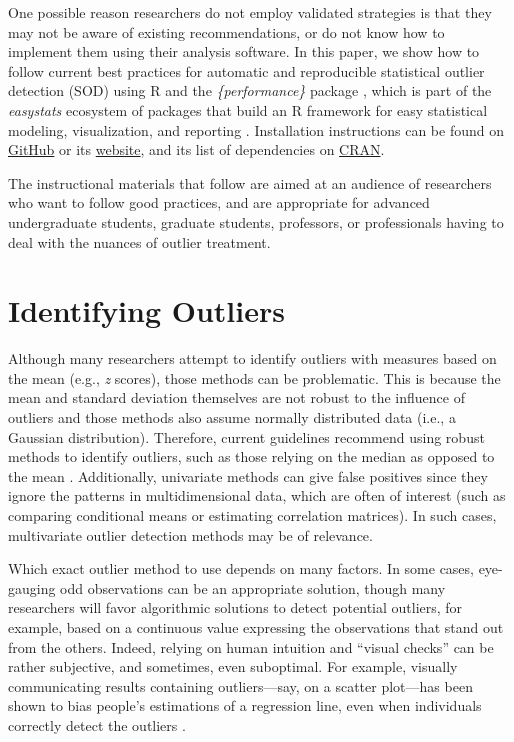 \documentclass[sn-basic, lineno,pdflatex]{sn-jnl}
\begin{document}
One possible reason researchers do not employ validated strategies is
that they may not be aware of existing recommendations, or do not know
how to implement them using their analysis software. In this paper, we
show how to follow current best practices for automatic and reproducible
statistical outlier detection (SOD) using R and the
\emph{\{performance\}} package \citep{ludecke2021performance}, which is
part of the \emph{easystats} ecosystem of packages that build an R
framework for easy statistical modeling, visualization, and reporting
\citep{easystatspackage}. Installation instructions can be found on
\href{https://github.com/easystats/performance}{GitHub} or its
\href{https://easystats.github.io/performance/}{website}, and its list
of dependencies on
\href{https://cran.r-project.org/package=performance}{CRAN}.

The instructional materials that follow are aimed at an audience of
researchers who want to follow good practices, and are appropriate for
advanced undergraduate students, graduate students, professors, or
professionals having to deal with the nuances of outlier treatment.

\section{Identifying Outliers}\label{identifying-outliers}

Although many researchers attempt to identify outliers with measures
based on the mean (e.g., \emph{z} scores), those methods can be
problematic. This is because the mean and standard deviation themselves
are not robust to the influence of outliers and those methods also
assume normally distributed data (i.e., a Gaussian distribution).
Therefore, current guidelines recommend using robust methods to identify
outliers, such as those relying on the median as opposed to the mean
\citep{leys2019outliers, leys2013outliers, leys2018outliers}.
Additionally, univariate methods can give false positives since they
ignore the patterns in multidimensional data, which are often of
interest (such as comparing conditional means or estimating correlation
matrices). In such cases, multivariate outlier detection methods may be
of relevance.

Which exact outlier method to use depends on many factors. In some
cases, eye-gauging odd observations can be an appropriate solution,
though many researchers will favor algorithmic solutions to detect
potential outliers, for example, based on a continuous value expressing
the observations that stand out from the others. Indeed, relying on
human intuition and ``visual checks'' can be rather subjective, and
sometimes, even suboptimal. For example, visually communicating results
containing outliers---say, on a scatter plot---has been shown to bias
people's estimations of a regression line, even when individuals
correctly detect the outliers \citep{ciccione2023outlier}.
\end{document}
